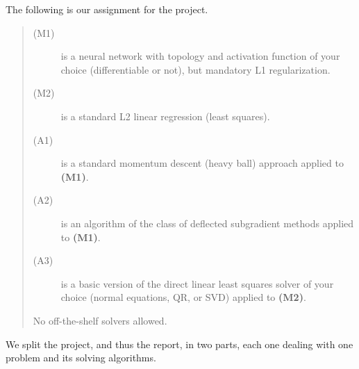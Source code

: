 The following is our assignment for the project.

\begin{quote}
    \begin{description}
    \item[(M1)] is a neural network with topology and activation function of your choice (differentiable or not), but mandatory L1 regularization.
    
    \item[(M2)] is a standard L2 linear regression (least squares).
    
    \item[(A1)] is a standard momentum descent (heavy ball) approach applied to \textbf{(M1)}.
    
    \item[(A2)] is an algorithm of the class of deflected subgradient methods applied to \textbf{(M1)}.
    
    \item[(A3)] is a basic version of the direct linear least squares solver of your choice (normal equations, QR, or SVD) applied to \textbf{(M2)}.
    
    \end{description}
    
    \noindent No off-the-shelf solvers allowed.
\end{quote}

\noindent We split the project, and thus the report, in two parts, each one dealing with one problem and its solving algorithms.